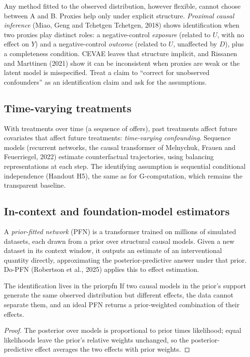 \documentclass[11pt]{article}
\begin{document}
Any method fitted to the observed distribution, however flexible, cannot choose between A and B. Proxies help only
under explicit structure. \emph{Proximal causal inference} (Miao, Geng and Tchetgen Tchetgen, 2018) shows
identification when two proxies play distinct roles: a negative-control \emph{exposure} (related to $U$, with no
effect on $Y$) and a negative-control \emph{outcome} (related to $U$, unaffected by $D$), plus a completeness
condition. CEVAE leaves that structure implicit, and Rissanen and Marttinen (2021) show it can be inconsistent when
proxies are weak or the latent model is misspecified. Treat a claim to ``correct for unobserved confounders'' as
an identification claim and ask for the assumptions.

\subsection{Time-varying treatments}

With treatments over time (a sequence of offers), past treatments affect future covariates that affect future
treatments: \emph{time-varying confounding}. Sequence models (recurrent networks, the causal transformer of
Melnychuk, Frauen and Feuerriegel, 2022) estimate counterfactual trajectories, using balancing representations at
each step. The identifying assumption is sequential conditional independence (Handout H5), the same as for
G-computation, which remains the transparent baseline.

\subsection{In-context and foundation-model estimators}

A \emph{prior-fitted network} (PFN) is a transformer trained on millions of simulated datasets, each drawn from a prior
over structural causal models. Given a new dataset in its context window, it outputs an estimate of an interventional
quantity directly, approximating the posterior-predictive answer under that prior. Do-PFN (Robertson et al., 2025)
applies this to effect estimation.

\begin{prop}{The identification lives in the prior}{pfn}
If two causal models in the prior's support generate the same observed distribution but different effects, the
data cannot separate them, and an ideal PFN returns a prior-weighted combination of their effects.
\end{prop}
\begin{proof}
The posterior over models is proportional to prior times likelihood; equal likelihoods leave the prior's relative
weights unchanged, so the posterior-predictive effect averages the two effects with prior weights.
\end{proof}
\end{document}

